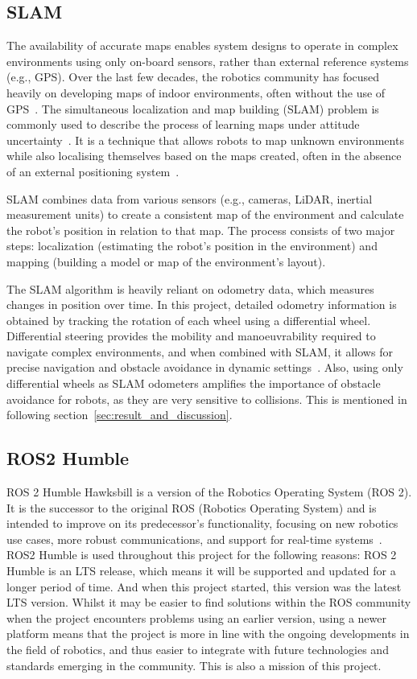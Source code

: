 \subsection{SLAM}
\label{subsec:slam}
The availability of accurate maps enables system designs to operate in complex environments using only on-board sensors, 
rather than external reference systems (e.g., GPS). 
Over the last few decades, the robotics community has focused heavily on developing maps of indoor environments, often without the use of GPS~\cite{slam}. 
The simultaneous localization and map building (SLAM) problem is commonly used to describe the process of learning maps under attitude uncertainty~\cite{slamoverview}. 
It is a technique that allows robots to map unknown environments while also localising themselves based on the maps created, 
often in the absence of an external positioning system~\cite{slamii}.

SLAM combines data from various sensors 
(e.g., cameras, LiDAR, inertial measurement units) to create a consistent map of the environment and calculate the robot's position in relation to that map. 
The process consists of two major steps: localization (estimating the robot's position in the environment) and mapping (building a model or map of the environment's layout).

The SLAM algorithm is heavily reliant on odometry data, which measures changes in position over time. 
In this project, detailed odometry information is obtained by tracking the rotation of each wheel using a differential wheel. 
Differential steering provides the mobility and manoeuvrability required to navigate complex environments, 
and when combined with SLAM, it allows for precise navigation and obstacle avoidance in dynamic settings~\cite{slamtutorial}. 
Also, using only differential wheels as SLAM odometers amplifies the importance of obstacle avoidance for robots, 
as they are very sensitive to collisions. This is mentioned in following section~\ref{sec:result_and_discussion}.

\subsection{ROS2 Humble}
ROS 2 Humble Hawksbill is a version of the Robotics Operating System (ROS 2).
It is the successor to the original ROS (Robotics Operating System) and is intended to improve on its predecessor's functionality,
focusing on new robotics use cases, more robust communications, and support for real-time systems~\cite{ros2}.
ROS2 Humble is used throughout this project for the following reasons: ROS 2 Humble is an LTS release, 
which means it will be supported and updated for a longer period of time. 
And when this project started, this version was the latest LTS version. 
Whilst it may be easier to find solutions within the ROS community when the project encounters problems using an earlier version, 
using a newer platform means that the project is more in line with the ongoing developments in the field of robotics, 
and thus easier to integrate with future technologies and standards emerging in the community. This is also a mission of this project.

